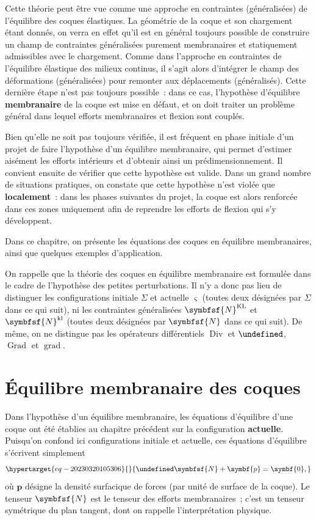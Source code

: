 \documentclass[
  a4paper,
  DIV=11,
  numbers=noendperiod]{scrreprt}
\newcommand{\Div}{\operatorname{Div}}
\let\div\undefined
\newcommand{\div}{\operatorname{div}}
\newcommand{\Grad}{\operatorname{Grad}}
\newcommand{\grad}{\operatorname{grad}}
\newcommand{\KL}{\mathrm{KL}}
\newcommand{\kl}{\mathrm{kl}}
\newcommand{\tens}[1]{\symbfsf{#1}}
\renewcommand{\vec}[1]{\symbf{#1}}
\begin{document}
Cette théorie peut être vue comme une approche en contraintes
(généralisées) de l'équilibre des coques élastiques. La géométrie de la
coque et son chargement étant donnés, on verra en effet qu'il est en
général toujours possible de construire un champ de contraintes
généralisées purement membranaires et statiquement admissibles avec le
chargement. Comme dans l'approche en contraintes de l'équilibre
élastique des milieux continus, il s'agit alors d'intégrer le champ des
déformations (généralisées) pour remonter aux déplacements
(généralisés). Cette dernière étape n'est pas toujours possible~: dans
ce cas, l'hypothèse d'équilibre \textbf{membranaire} de la coque est
mise en défaut, et on doit traiter un problème général dans lequel
efforts membranaires et flexion sont couplés.

Bien qu'elle ne soit pas toujours vérifiée, il est fréquent en phase
initiale d'un projet de faire l'hypothèse d'un équilibre membranaire,
qui permet d'estimer aisément les efforts intérieurs et d'obtenir ainsi
un prédimensionnement. Il convient ensuite de vérifier que cette
hypothèse est valide. Dans un grand nombre de situations pratiques, on
constate que cette hypothèse n'est violée que \textbf{localement}~: dans
les phases suivantes du projet, la coque est alors renforcée dans ces
zones uniquement afin de reprendre les efforts de flexion qui s'y
développent.

Dans ce chapitre, on présente les équations des coques en équilibre
membranaires, ainsi que quelques exemples d'application.

On rappelle que la théorie des coques en équilibre membranaire est
formulée dans le cadre de l'hypothèse des petites perturbations. Il n'y
a donc pas lieu de distinguer les configurations initiale \(\Sigma\) et
actuelle \(\varsigma\) (toutes deux désignées par \(\Sigma\) dans ce qui
suit), ni les contraintes généralisées \(\tens{N}^\KL\) et
\(\tens{N}^\kl\) (toutes deux désignées par \(\tens{N}\) dans ce qui
suit). De même, on ne distingue pas les opérateurs différentiels
\(\Div\) et \(\div\), \(\Grad\) et \(\grad\).

\hypertarget{uxe9quilibre-membranaire-des-coques}{%
\section{Équilibre membranaire des
coques}\label{uxe9quilibre-membranaire-des-coques}}

Dans l'hypothèse d'un équilibre membranaire, les équations d'équilibre
d'une coque ont été établies au chapitre précédent sur la configuration
\textbf{actuelle}. Puisqu'on confond ici configurations initiale et
actuelle, ces équations d'équilibre s'écrivent simplement
\begin{equation}\protect\hypertarget{eq-20230320105306}{}{
\div \tens{N} + \vec{p} = \vec{0},
}\label{eq-20230320105306}\end{equation} où \(\vec{p}\) désigne la
densité surfacique de forces (par unité de surface de la coque). Le
tenseur \(\tens{N}\) est le tenseur des efforts membranaires~; c'est un
tenseur symétrique du plan tangent, dont on rappelle l'interprétation
physique.
\end{document}
